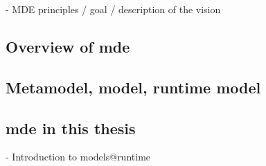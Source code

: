 - MDE principles / goal / description of the vision

\subsection{Overview of \gls{mde}}

\subsection{Metamodel, model, runtime model}

\subsection{\gls{mde} in this thesis}

- Introduction to models@runtime